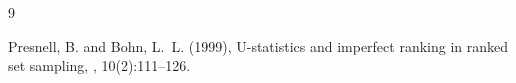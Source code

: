 \documentclass[twoside]{article}
\begin{document}
\begin{thebibliography}{9}
%
%
%

Presnell, B. and Bohn, L.~L. (1999),
\newblock U-statistics and imperfect ranking in ranked set sampling,
, 10(2):111--126.
%
%


\end{thebibliography}
\end{document}
